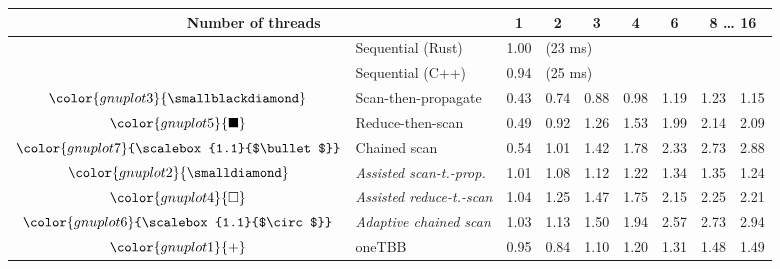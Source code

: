 \begin{tabular}{clrrrrrrr}
\toprule
\multicolumn{2}{c}{\textbf{Number of threads}} & \multicolumn{1}{c}{\textbf{ 1 }} & \multicolumn{1}{c}{\textbf{ 2 }} & \multicolumn{1}{c}{\textbf{ 3 }} & \multicolumn{1}{c}{\textbf{ 4 }} & \multicolumn{1}{c}{\textbf{ 6 }} & \multicolumn{2}{c}{\textbf{ 8 } \dots \textbf{ 16 }} \\
\midrule
& Sequential (Rust) & \multicolumn{1}{r}{ 1.00 } & \multicolumn{ 6 }{l}{(23 ms)} \\
& Sequential (C++) & \multicolumn{1}{r}{ 0.94 } & \multicolumn{ 6 }{l}{(25 ms)} \\
\rowcolor{gnuplot3!10}$\color{gnuplot3}{\smallblackdiamond}$ & Scan-then-propagate & \cellcolor{gnuplot3!10} 0.43 & \cellcolor{gnuplot3!10} 0.74 & \cellcolor{gnuplot3!10} 0.88 & \cellcolor{gnuplot3!10} 0.98 & \cellcolor{gnuplot3!10} 1.19 & \cellcolor{gnuplot3!10} 1.23 & \cellcolor{gnuplot3!10} 1.15 \\
\rowcolor{gnuplot5!10}$\color{gnuplot5}{\blacksquare}$ & Reduce-then-scan & \cellcolor{gnuplot5!10} 0.49 & \cellcolor{gnuplot5!10} 0.92 & \cellcolor{gnuplot5!10} 1.26 & \cellcolor{gnuplot5!10} 1.53 & \cellcolor{gnuplot5!10} 1.99 & \cellcolor{gnuplot5!10} 2.14 & \cellcolor{gnuplot5!10} 2.09 \\
\rowcolor{gnuplot7!10}$\color{gnuplot7}{\scalebox{1.1}{$\bullet$}}$ & Chained scan & \cellcolor{gnuplot7!10} 0.54 & \cellcolor{gnuplot7!10} 1.01 & \cellcolor{gnuplot7!10} 1.42 & \cellcolor{gnuplot7!10} 1.78 & \cellcolor{gnuplot7!10} 2.33 & \cellcolor{gnuplot7!10} 2.73 & \cellcolor{gnuplot7!10} 2.88 \\
\rowcolor{gnuplot2!30}$\color{gnuplot2}{\smalldiamond}$ & \textit{Assisted scan-t.-prop.} & \cellcolor{gnuplot2!30} 1.01 & \cellcolor{gnuplot2!30} 1.08 & \cellcolor{gnuplot2!30} 1.12 & \cellcolor{gnuplot2!30} 1.22 & \cellcolor{gnuplot2!30} 1.34 & \cellcolor{gnuplot2!30} 1.35 & \cellcolor{gnuplot2!30} 1.24 \\
\rowcolor{gnuplot4!30}$\color{gnuplot4}{\square}$ & \textit{Assisted reduce-t.-scan} & \cellcolor{gnuplot4!30} 1.04 & \cellcolor{gnuplot4!30} 1.25 & \cellcolor{gnuplot4!30} 1.47 & \cellcolor{gnuplot4!30} 1.75 & \cellcolor{gnuplot4!30} 2.15 & \cellcolor{gnuplot4!30} 2.25 & \cellcolor{gnuplot4!30} 2.21 \\
\rowcolor{gnuplot6!30}$\color{gnuplot6}{\scalebox{1.1}{$\circ$}}$ & \textit{Adaptive chained scan} & \cellcolor{gnuplot6!30} 1.03 & \cellcolor{gnuplot6!30} 1.13 & \cellcolor{gnuplot6!30} 1.50 & \cellcolor{gnuplot6!30} 1.94 & \cellcolor{gnuplot6!30} 2.57 & \cellcolor{gnuplot6!30} 2.73 & \cellcolor{gnuplot6!30} 2.94 \\
\rowcolor{gnuplot1!10}$\color{gnuplot1}{+}$ & oneTBB & \cellcolor{gnuplot1!10} 0.95 & \cellcolor{gnuplot1!10} 0.84 & \cellcolor{gnuplot1!10} 1.10 & \cellcolor{gnuplot1!10} 1.20 & \cellcolor{gnuplot1!10} 1.31 & \cellcolor{gnuplot1!10} 1.48 & \cellcolor{gnuplot1!10} 1.49 \\
\bottomrule
\end{tabular}
